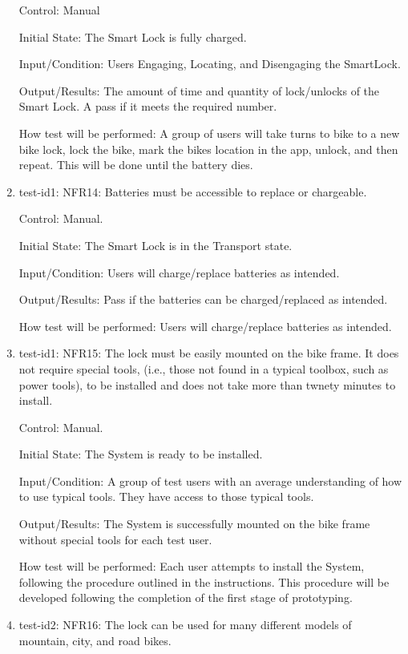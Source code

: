 \documentclass[12pt, titlepage]{article}
\begin{document}
\begin{enumerate}
Control: Manual 

Initial State: The Smart Lock is fully charged.

Input/Condition: Users Engaging, Locating, and Disengaging the SmartLock.

Output/Results: The amount of time and quantity of lock/unlocks of the Smart Lock. A pass if it meets the required number.

How test will be performed:  A group of users will take turns to bike to a new bike lock, lock the bike, mark the bikes location in the app, unlock, and then repeat. This will be done until the battery dies.

\item{test-id1: NFR14: Batteries must be accessible to replace or chargeable. \\}

Control: Manual.

Initial State: The Smart Lock is in the Transport state.

Input/Condition: Users will charge/replace batteries as intended.

Output/Results: Pass if the batteries can be charged/replaced as intended.

How test will be performed: Users will charge/replace batteries as intended.

\item{test-id1: NFR15: The lock must be easily mounted on the bike frame. It does not require special tools, (i.e., those not found in a typical toolbox, such as power tools), to be installed and does not take more than twnety minutes to install.  \\}

Control: Manual.

Initial State: The System is ready to be installed.  

Input/Condition: A group of test users with an average understanding of how to use typical tools. They have access to those typical tools. 

Output/Results: The System is successfully mounted on the bike frame without special tools for each test user. 

How test will be performed: Each user attempts to install the System, following the procedure outlined in the instructions. This procedure will be developed following the completion of the first stage of prototyping. 

\item{test-id2: NFR16: The lock can be used for many different models of mountain, city, and road bikes.  \\}


\end{enumerate}
\end{document}
